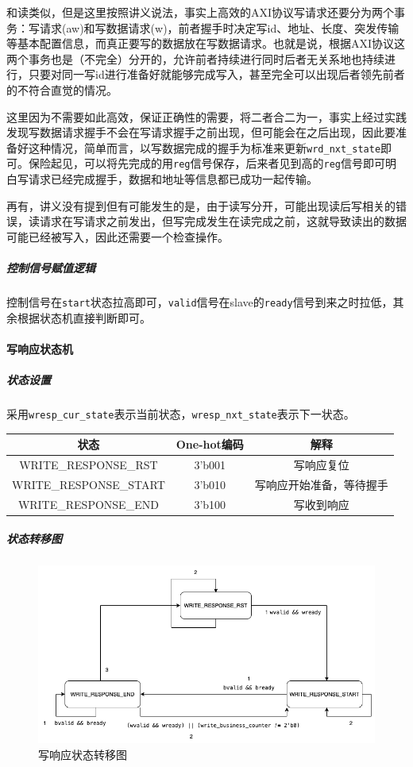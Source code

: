 \documentclass[UTF-8,twoside,c5size]{ctexart}
\begin{document}
	和读类似，但是这里按照讲义说法，事实上高效的AXI协议写请求还要分为两个事务：写请求(aw)和写数据请求(w)，前者握手时决定写id、地址、长度、突发传输等基本配置信息，而真正要写的数据放在写数据请求。也就是说，根据AXI协议这两个事务也是（不完全）分开的，允许前者持续进行同时后者无关系地也持续进行，只要对同一写id进行准备好就能够完成写入，甚至完全可以出现后者领先前者的不符合直觉的情况。
	
	这里因为不需要如此高效，保证正确性的需要，将二者合二为一，事实上经过实践发现写数据请求握手不会在写请求握手之前出现，但可能会在之后出现，因此要准备好这种情况，简单而言，以写数据完成的握手为标准来更新\texttt{wrd_nxt_state}即可。保险起见，可以将先完成的用\texttt{reg}信号保存，后来者见到高的\texttt{reg}信号即可明白写请求已经完成握手，数据和地址等信息都已成功一起传输。
	
	再有，讲义没有提到但有可能发生的是，由于读写分开，可能出现读后写相关的错误，读请求在写请求之前发出，但写完成发生在读完成之前，这就导致读出的数据可能已经被写入，因此还需要一个检查操作。
	
	\subparagraph{控制信号赋值逻辑}\hfill
	
	控制信号在\texttt{start}状态拉高即可，\texttt{valid}信号在slave的\texttt{ready}信号到来之时拉低，其余根据状态机直接判断即可。
	
	\paragraph{写响应状态机}\hfill
	
	\subparagraph{状态设置}\hfill
	
	采用\texttt{wresp_cur_state}表示当前状态，\texttt{wresp_nxt_state}表示下一状态。
	
	\begin{center}
	\begin{tabular}{|c|c|c|}
	\hline
  	\textbf{状态} & \textbf{One-hot编码} & \textbf{解释} \\
  	\hline
	WRITE_RESPONSE_RST & 3'b001 & 写响应复位 \\
	\hline
	WRITE_RESPONSE_START & 3'b010 & 写响应开始准备，等待握手 \\
	\hline
	WRITE_RESPONSE_END & 3'b100 & 写收到响应 \\
	\hline
	\end{tabular}
	\end{center}
	
	\subparagraph{状态转移图}\hfill
	
	\begin{figure}[h]
		\centering
		\includegraphics[width=0.75\linewidth]{figures/WRESP.png}
		\caption[rreq_status]{写响应状态转移图}
		\label{fig:rreq_status}
	\end{figure}
	
\end{document}
